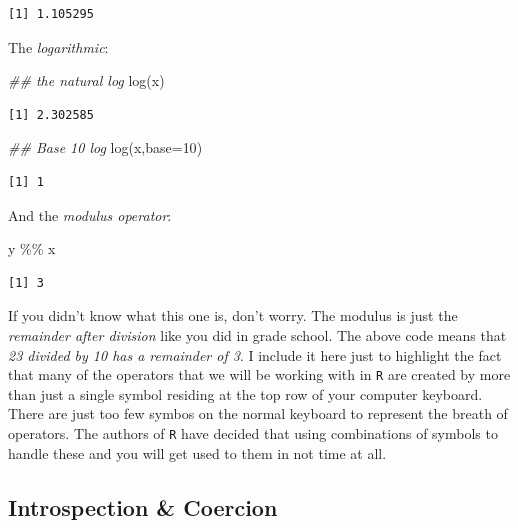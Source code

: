\documentclass[
  letterpaper,
]{book}
\newenvironment{Shaded}{\begin{snugshade}}{\end{snugshade}}
\newcommand{\AttributeTok}[1]{\textcolor[rgb]{0.40,0.45,0.13}{#1}}
\newcommand{\DecValTok}[1]{\textcolor[rgb]{0.68,0.00,0.00}{#1}}
\newcommand{\DocumentationTok}[1]{\textcolor[rgb]{0.37,0.37,0.37}{\textit{#1}}}
\newcommand{\FunctionTok}[1]{\textcolor[rgb]{0.28,0.35,0.67}{#1}}
\newcommand{\NormalTok}[1]{\textcolor[rgb]{0.00,0.23,0.31}{#1}}
\newcommand{\SpecialCharTok}[1]{\textcolor[rgb]{0.37,0.37,0.37}{#1}}
\begin{document}
\begin{verbatim}
[1] 1.105295
\end{verbatim}

The \emph{logarithmic}:

\begin{Shaded}
\begin{Highlighting}[]
\DocumentationTok{\#\# the natural log}
\FunctionTok{log}\NormalTok{(x)}
\end{Highlighting}
\end{Shaded}

\begin{verbatim}
[1] 2.302585
\end{verbatim}

\begin{Shaded}
\begin{Highlighting}[]
\DocumentationTok{\#\# Base 10 log}
\FunctionTok{log}\NormalTok{(x,}\AttributeTok{base=}\DecValTok{10}\NormalTok{)}
\end{Highlighting}
\end{Shaded}

\begin{verbatim}
[1] 1
\end{verbatim}

And the \emph{modulus operator}:

\begin{Shaded}
\begin{Highlighting}[]
\NormalTok{y }\SpecialCharTok{\%\%}\NormalTok{ x}
\end{Highlighting}
\end{Shaded}

\begin{verbatim}
[1] 3
\end{verbatim}

If you didn't know what this one is, don't worry. The modulus is just
the \emph{remainder after division} like you did in grade school. The
above code means that \emph{23 divided by 10 has a remainder of 3}. I
include it here just to highlight the fact that many of the operators
that we will be working with in \texttt{R} are created by more than just
a single symbol residing at the top row of your computer keyboard. There
are just too few symbos on the normal keyboard to represent the breath
of operators. The authors of \texttt{R} have decided that using
combinations of symbols to handle these and you will get used to them in
not time at all.

\subsection{Introspection \& Coercion}\label{introspection-coercion}
\end{document}
